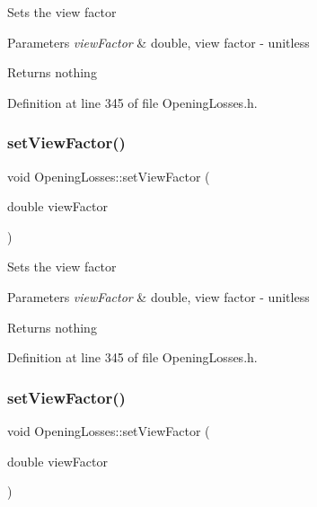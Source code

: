 Sets the view factor


\begin{DoxyParams}{Parameters}
{\em view\+Factor} & double, view factor -\/ unitless\\
\hline
\end{DoxyParams}
\begin{DoxyReturn}{Returns}
nothing 
\end{DoxyReturn}


Definition at line 345 of file Opening\+Losses.\+h.

\mbox{\label{class_opening_losses_a4e6c6f1549e01cd4b82b7505e403d643}} 
\subsubsection{\texorpdfstring{set\+View\+Factor()}{setViewFactor()}\hspace{0.1cm}{\footnotesize\ttfamily [2/3]}}
{\footnotesize\ttfamily void Opening\+Losses\+::set\+View\+Factor (\begin{DoxyParamCaption}\item[{double}]{view\+Factor }\end{DoxyParamCaption})\hspace{0.3cm}{\ttfamily [inline]}}

Sets the view factor


\begin{DoxyParams}{Parameters}
{\em view\+Factor} & double, view factor -\/ unitless\\
\hline
\end{DoxyParams}
\begin{DoxyReturn}{Returns}
nothing 
\end{DoxyReturn}


Definition at line 345 of file Opening\+Losses.\+h.

\mbox{\label{class_opening_losses_a4e6c6f1549e01cd4b82b7505e403d643}} 
\subsubsection{\texorpdfstring{set\+View\+Factor()}{setViewFactor()}\hspace{0.1cm}{\footnotesize\ttfamily [3/3]}}
{\footnotesize\ttfamily void Opening\+Losses\+::set\+View\+Factor (\begin{DoxyParamCaption}\item[{double}]{view\+Factor }\end{DoxyParamCaption})\hspace{0.3cm}{\ttfamily [inline]}}

